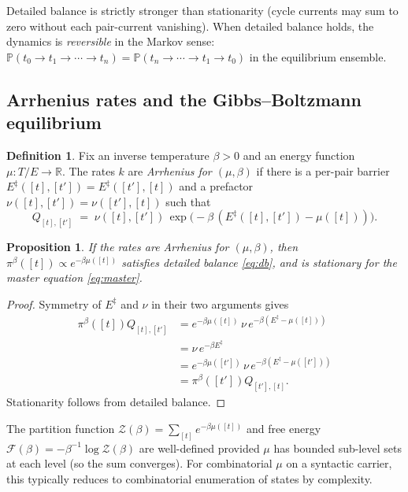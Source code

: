 \documentclass[11pt]{article}
\theoremstyle{plain}
\newtheorem{proposition}[theorem]{Proposition}
\theoremstyle{definition}
\newtheorem{definition}[theorem]{Definition}
\theoremstyle{remark}
\newcommand{\R}{\mathbb{R}}
\newcommand{\Prob}{\mathbb{P}}
\newcommand{\Z}{\mathcal{Z}}
\newcommand{\F}{\mathcal{F}}
\begin{document}
Detailed balance is strictly stronger than stationarity (cycle currents may sum to zero without each pair-current vanishing). When detailed balance holds, the dynamics is \emph{reversible} in the Markov sense: $\Prob(t_0 \to t_1 \to \cdots \to t_n) = \Prob(t_n \to \cdots \to t_1 \to t_0)$ in the equilibrium ensemble.

\subsection{Arrhenius rates and the Gibbs--Boltzmann equilibrium}

\begin{definition}\label{def:arrhenius}
Fix an inverse temperature $\beta > 0$ and an energy function $\mu : T/E \to \R$. The rates $k$ are \emph{Arrhenius for $(\mu, \beta)$} if there is a per-pair barrier $E^\ddagger([t],[t']) = E^\ddagger([t'],[t])$ and a prefactor $\nu([t],[t']) = \nu([t'],[t])$ such that
\begin{equation}\label{eq:eyring}
Q_{[t],[t']} \;=\; \nu([t],[t']) \, \exp\bigl(-\beta\,(E^\ddagger([t],[t']) - \mu([t]))\bigr).
\end{equation}
\end{definition}

\begin{proposition}\label{prop:boltzmann}
If the rates are Arrhenius for $(\mu, \beta)$, then $\pi^\beta([t]) \propto e^{-\beta \mu([t])}$ satisfies detailed balance \eqref{eq:db}, and is stationary for the master equation \eqref{eq:master}.
\end{proposition}

\begin{proof}
Symmetry of $E^\ddagger$ and $\nu$ in their two arguments gives
\begin{align*}
\pi^\beta([t]) Q_{[t],[t']} &= e^{-\beta\mu([t])} \, \nu \, e^{-\beta(E^\ddagger - \mu([t]))} \\
&= \nu \, e^{-\beta E^\ddagger}\\
&= e^{-\beta\mu([t'])} \, \nu \, e^{-\beta(E^\ddagger - \mu([t']))} \\
&= \pi^\beta([t']) Q_{[t'],[t]}.
\end{align*}
Stationarity follows from detailed balance.
\end{proof}

The partition function $\Z(\beta) = \sum_{[t]} e^{-\beta \mu([t])}$ and free energy $\F(\beta) = -\beta^{-1} \log \Z(\beta)$ are well-defined provided $\mu$ has bounded sub-level sets at each level (so the sum converges). For combinatorial $\mu$ on a syntactic carrier, this typically reduces to combinatorial enumeration of states by complexity.
\end{document}
